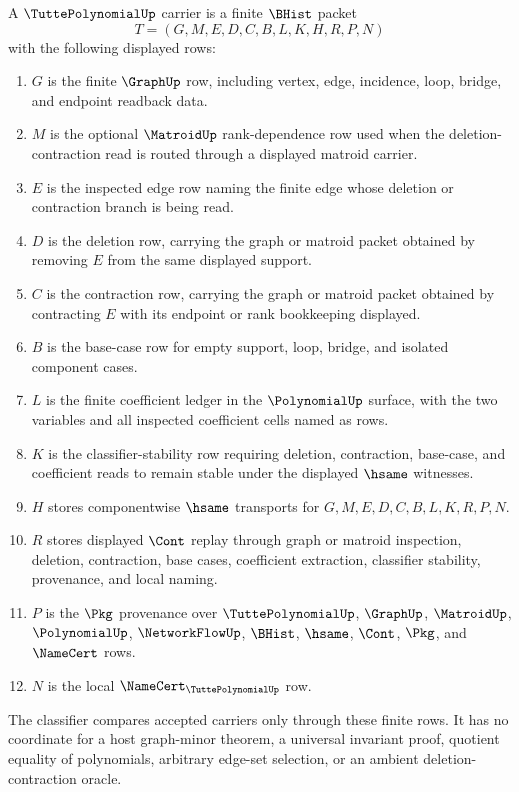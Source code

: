 \begin{definition}
\label{def:tutte-polynomial-carrier}
A $\TuttePolynomialUp$ carrier is a finite $\BHist$ packet
$$
T=(G,M,E,D,C,B,L,K,H,R,P,N)
$$
with the following displayed rows:
\begin{enumerate}
\item $G$ is the finite $\GraphUp$ row, including vertex, edge, incidence, loop, bridge, and endpoint readback data.
\item $M$ is the optional $\MatroidUp$ rank-dependence row used when the deletion-contraction read is routed through a displayed matroid carrier.
\item $E$ is the inspected edge row naming the finite edge whose deletion or contraction branch is being read.
\item $D$ is the deletion row, carrying the graph or matroid packet obtained by removing $E$ from the same displayed support.
\item $C$ is the contraction row, carrying the graph or matroid packet obtained by contracting $E$ with its endpoint or rank bookkeeping displayed.
\item $B$ is the base-case row for empty support, loop, bridge, and isolated component cases.
\item $L$ is the finite coefficient ledger in the $\PolynomialUp$ surface, with the two variables and all inspected coefficient cells named as rows.
\item $K$ is the classifier-stability row requiring deletion, contraction, base-case, and coefficient reads to remain stable under the displayed $\hsame$ witnesses.
\item $H$ stores componentwise $\hsame$ transports for $G,M,E,D,C,B,L,K,R,P,N$.
\item $R$ stores displayed $\Cont$ replay through graph or matroid inspection, deletion, contraction, base cases, coefficient extraction, classifier stability, provenance, and local naming.
\item $P$ is the $\Pkg$ provenance over $\TuttePolynomialUp$, $\GraphUp$, $\MatroidUp$, $\PolynomialUp$, $\NetworkFlowUp$, $\BHist$, $\hsame$, $\Cont$, $\Pkg$, and $\NameCert$ rows.
\item $N$ is the local $\NameCert_{\TuttePolynomialUp}$ row.
\end{enumerate}
The classifier compares accepted carriers only through these finite rows. It has no coordinate for a host graph-minor theorem, a universal invariant proof, quotient equality of polynomials, arbitrary edge-set selection, or an ambient deletion-contraction oracle.
\end{definition}

